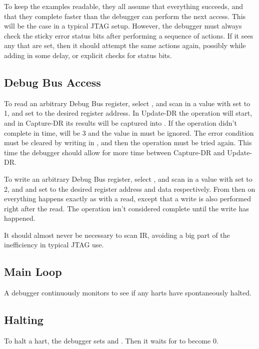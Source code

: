 \documentclass{article}
\begin{document}
To keep the examples readable, they all assume that everything succeeds, and
that they complete faster than the debugger can perform the next access. This
will be the case in a typical JTAG setup. However, the debugger must always
check the sticky error status bits after performing a sequence of actions. If
it sees any that are set, then it should attempt the same actions again,
possibly while adding in some delay, or explicit checks for status bits.

\subsection{Debug Bus Access} \label{dbusaccess}

To read an arbitrary Debug Bus register, select \Rdbus, and scan in a value
with \Fop set to 1, and \Faddress set to the desired register address. In
Update-DR the operation will start, and in Capture-DR its results will be
captured into \Fdata.  If the operation didn't complete in time, \Fop will be 3
and the value in \Fdata must be ignored. The error condition must be cleared by
writing \Fdbusreset in \Rdtmcontrol, and then the operation must be tried
again. This time the debugger should allow for more time between Capture-DR and
Update-DR.

To write an arbitrary Debug Bus register, select \Rdbus, and scan in a value
with \Fop set to 2, and \Faddress and \Fdata set to the desired register
address and data respectively. From then on everything happens exactly as with
a read, except that a write is also performed right after the read. The
operation isn't considered complete until the write has happened.

It should almost never be necessary to scan IR, avoiding a big part of the
inefficiency in typical JTAG use.

\subsection{Main Loop}

A debugger continuously monitors \Rhaltsum to see if any harts have spontaneously
halted.

\subsection{Halting} \label{deb:halt}

To halt a hart, the debugger sets \Fhartsel and \Fhaltreq. Then it waits for
\Fhartstatus to become 0.
\end{document}
